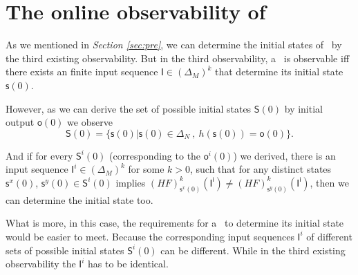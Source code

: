

\section{The online observability of \BCNs}
\label{sec:online}

%



As we mentioned in {\em Section \ref{sec:pre}}, we can determine the initial states of \BCNs\ by the third existing observability.  But in the third observability, a \BCN\ is observable iff there exists an finite input sequence $\mathsf{I}\in(\Delta_M)^k$ that determine its initial state $\mathsf{s}(0)$. 

However, as we can derive the set of possible initial states $\mathsf{S}(0)$ by initial output $\mathsf{o}(0)$ we observe
\[\mathsf{S}(0)=\{\mathsf{s}(0)|\mathsf{s}(0)\in \Delta_N\ ,\ h( \mathsf{s}(0))=\mathsf{o}(0)\}.\]



And if for every $\mathsf{S}^{i}(0)$ (corresponding to the $\mathsf{o}^{i}(0)$) we derived, there is an input sequence $\mathsf{I}^{i}\in(\Delta_M)^k$ for some $k>0$, such that for any distinct states $\mathsf{s}^{x}(0)$, $\mathsf{s}^{y}(0) \in \mathsf{S}^{i}(0)$ implies $(HF)^k_{\mathsf{s}^{x}(0)}(\mathsf{I^i})\neq (HF)^k_{\mathsf{s}^{y}(0)}(\mathsf{I^i})$,
then we can determine the initial state too.

 
What is more, in this case, the requirements for a \BCN\ to determine its initial state would be easier to meet. Because the corresponding input sequences $\mathsf{I}^{i}$ of different sets of possible initial states $\mathsf{S}^{i}(0)$ can be different. While in the third existing observability the $\mathsf{I}^{i}$ has to be identical.

